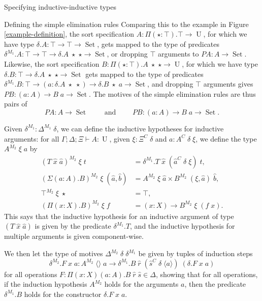 \documentclass[runningheads]{llncs}
\DeclareMathOperator{\USet}{Set}
\DeclareMathOperator{\UU}{U}
\newcommand{\tac}{\vdash}
\def\emptytuple{\langle\rangle}
\begin{document}
{\begin{section}{Specifying inductive-inductive types}
\begin{subsection}{\label{simple-elim-section}Defining the simple elimination rules}
Comparing this to the example in Figure \ref{example-definition}, the sort specification $A : \Pi(\star : \top).\top \to \UU$, for which we have type $\delta.A : \top \to \top \to \USet$, gets mapped to the type of predicates $\delta^{M_1}.A : \top \to \top \to \delta.A\;\star\;\star \to \USet$, or dropping $\top$ arguments to $PA : A \to \USet$. Likewise, the sort specification $B : \Pi(\star : \top).A\;\star\;\star \to \UU$, for which we have type $\delta.B : \top \to \delta.A\;\star\;\star \to \USet$ gets mapped to the type of predicates $\delta^{M_1}.B : \top \to (a : \delta.A\;\star\;\star) \to \delta.B\;\star\;a \to \USet$, and dropping $\top$ arguments gives $PB : (a : A) \to B\;a \to \USet$. The motives of the simple elimination rules are thus pairs of \[PA : A \to \USet\qquad\text{ and }\qquad PB : (a : A) \to B\;a \to \USet.\]

\begin{definition}
Given $\delta^{M_1} : \Delta^{M_1}\;\delta$, we can define the inductive hypotheses for inductive arguments: for all $\Gamma ; \Delta ; \Xi \tac A : \UU$, given $\xi : \Xi^C\;\delta$ and $a : A^C\;\delta\;\xi$, we define the type $A^{M_2}\;\xi\;a$ by
\begin{align*}
(T\;\hat{x}\;\hat{a})^{M_2}\;\xi\;t &= \delta^{M_1}.T\;\hat{x}\;(\hat{a}^{C}\;\delta\;\xi)\;t,\\
(\Sigma(a : A).B)^{M_2}\;\xi\;(\hat{a},\hat{b}) &= A^{M_2}\;\xi\;\hat{a} \times B^{M_2}\;(\xi,\hat{a})\;\hat{b},\\
\top^{M_2}\;\xi\;\star &= \top,\\
(\Pi(x : X).B)^{M_2}\;\xi\;f &= (x : X) \to B^{M_2}\;\xi\;(f\;x).
\end{align*}
This says that the inductive hypothesis for an inductive argument of type $(T\;\hat{x}\;\hat{a})$ is given by the predicate $\delta^{M_1}.T$, and the inductive hypothesis for multiple arguments is given component-wise.

We then let the type of motives $\Delta^{M_2}\;\delta\;\delta^{M_1}$ be given by tuples of induction steps \[\delta^{M_2}.F\;x\;a : A^{M_2}\;\emptytuple\;a\to \delta^{M_1}.B\; \hat{r}\;(\hat{s}^C\;\delta\;\langle a \rangle)\;(\delta.F\;x\;a)\] for all operations $F : \Pi(x : X)(a : A).B\;\hat{r}\;\hat{s} \in \Delta$, showing that for all operations, if the induction hypothesis $A^{M_2}$ holds for the arguments $a$, then the predicate $\delta^{M_1}.B$ holds for the constructor $\delta.F\;x\;a$.
\end{definition}


\end{subsection}
\end{section}}
\end{document}
